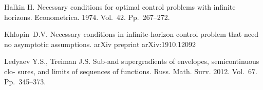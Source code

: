 	\begin{thebibliography}{99}
Halkin H. {    Necessary conditions for optimal control problems with infinite horizons}. Econometrica. 1974. Vol.~42. Pp.~267--272.

Khlopin~D.V. {  Necessary conditions in infinite-horizon control problem
	that need no asymptotic assumptions}. arXiv preprint arXiv:1910.12092

 Ledyaev Y.S., Treiman J.S. {  Sub-and supergradients of envelopes, semicontinuous clo-
sures, and limits of sequences of functions.} Russ. Math. Surv. 2012. Vol.~67. Pp.~345--373.
	\end{thebibliography}
	
	
	
	
	
	
%